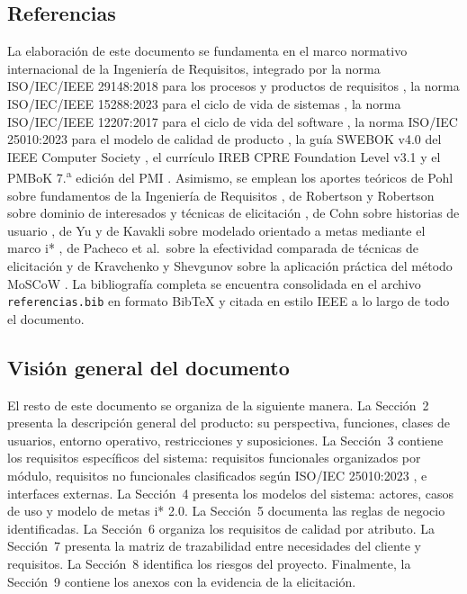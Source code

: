 \documentclass[12pt,a4paper]{article}
\begin{document}
\subsection{Referencias}

La elaboración de este documento se fundamenta en el marco normativo
internacional de la Ingeniería de Requisitos, integrado por la norma
ISO/IEC/IEEE 29148:2018 para los procesos y productos de requisitos
\cite{ISO29148:2018}, la norma ISO/IEC/IEEE 15288:2023 para el ciclo de vida de
sistemas \cite{ISO15288:2023}, la norma ISO/IEC/IEEE 12207:2017 para el ciclo de
vida del software \cite{ISO12207:2017}, la norma ISO/IEC 25010:2023 para el
modelo de calidad de producto \cite{ISO25010:2023}, la guía SWEBOK v4.0 del IEEE
Computer Society \cite{SWEBOK2024}, el currículo IREB CPRE Foundation Level
v3.1 \cite{IREB2023} y el PMBoK 7.\textsuperscript{a} edición del PMI
\cite{PMI2021}. Asimismo, se emplean los aportes teóricos de Pohl sobre
fundamentos de la Ingeniería de Requisitos \cite{Pohl2010}, de Robertson y
Robertson sobre dominio de interesados y técnicas de elicitación
\cite{Robertson2012}, de Cohn sobre historias de usuario \cite{Cohn2004}, de Yu
y de Kavakli sobre modelado orientado a metas mediante el marco i*
\cite{Yu1995,Kavakli2002}, de Pacheco et al.\ sobre la efectividad comparada de
técnicas de elicitación \cite{Pacheco2018} y de Kravchenko y Shevgunov sobre la
aplicación práctica del método MoSCoW \cite{Kravchenko2022}. La bibliografía
completa se encuentra consolidada en el archivo \texttt{referencias.bib} en
formato BibTeX y citada en estilo IEEE a lo largo de todo el documento.

\subsection{Visión general del documento}

El resto de este documento se organiza de la siguiente manera. La
Sección~2 presenta la descripción general del producto: su perspectiva,
funciones, clases de usuarios, entorno operativo, restricciones y
suposiciones. La Sección~3 contiene los requisitos específicos del sistema:
requisitos funcionales organizados por módulo, requisitos no funcionales
clasificados según ISO/IEC 25010:2023 \cite{ISO25010:2023}, e interfaces
externas. La Sección~4 presenta los modelos del sistema: actores, casos de
uso y modelo de metas i* 2.0. La Sección~5 documenta las reglas de negocio
identificadas. La Sección~6 organiza los requisitos de calidad por atributo. La
Sección~7 presenta la matriz de trazabilidad entre necesidades del cliente y
requisitos. La Sección~8 identifica los riesgos del proyecto. Finalmente, la
Sección~9 contiene los anexos con la evidencia de la elicitación.
\end{document}
